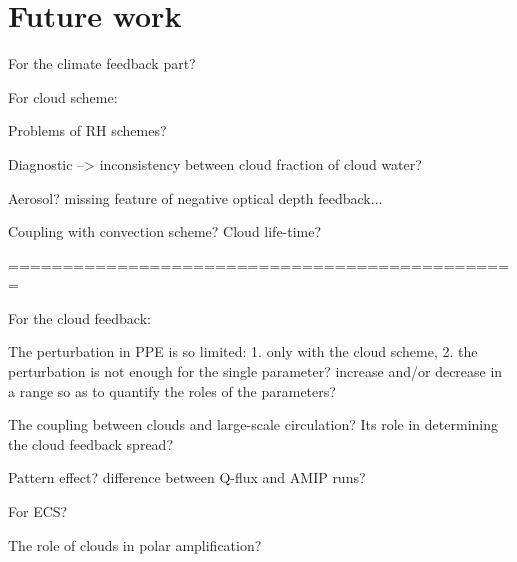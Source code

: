 \section{Future work}

For the climate feedback part?

For cloud scheme:

Problems of RH schemes?

Diagnostic --> inconsistency between cloud fraction of cloud water?

Aerosol? missing feature of negative optical depth feedback...

Coupling with convection scheme? Cloud life-time?

===============================================

For the cloud feedback:

The perturbation in PPE is so limited: 1. only with the cloud scheme, 2. the perturbation is not enough for the single parameter? increase and/or decrease in a range so as to quantify the roles of the parameters? 

The coupling between clouds and large-scale circulation? Its role in determining the cloud feedback spread?

Pattern effect? difference between Q-flux and AMIP runs?

For ECS?

The role of clouds in polar amplification?


